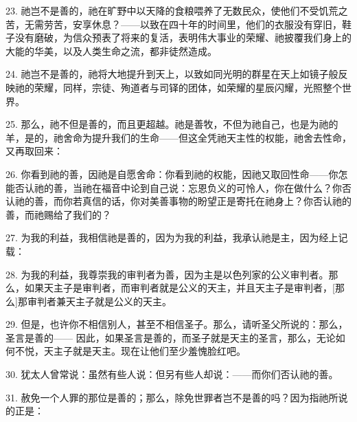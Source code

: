 23. 祂岂不是善的，祂在旷野中以天降的食粮喂养了无数民众，使他们不受饥荒之苦，无需劳苦，安享休息？——以致在四十年的时间里，他们的衣服没有穿旧，鞋子没有磨破，为信众预表了将来的复活，表明伟大事业的荣耀、祂披覆我们身上的大能的华美，以及人类生命之流，都非徒然造成。\par

24. 祂岂不是善的，祂将大地提升到天上，以致如同光明的群星在天上如镜子般反映祂的荣耀，同样，宗徒、殉道者与司铎的团体，如荣耀的星辰闪耀，光照整个世界。\par

25. 那么，祂不但是善的，而且更超越。祂是善牧，不但为祂自己，也是为祂的羊，是的，祂舍命为提升我们的生命——但这全凭祂天主性的权能，祂舍去性命，又再取回来：\par

26. 你看到祂的善，因祂是自愿舍命：你看到祂的权能，因祂又取回性命——你怎能否认祂的善，当祂在福音中论到自己说：忘恩负义的可怜人，你在做什么？你否认祂的善，而你若真信的话，你对美善事物的盼望正是寄托在祂身上？你否认祂的善，而祂赐给了我们的？\par

27. 为我的利益，我相信祂是善的，因为为我的利益，我承认祂是主，因为经上记载：\par

28. 为我的利益，我尊崇我的审判者为善，因为主是以色列家的公义审判者。那么，如果天主子是审判者，而审判者就是公义的天主，并且天主子是审判者，[那么]那审判者兼天主子就是公义的天主。\par

29. 但是，也许你不相信别人，甚至不相信圣子。那么，请听圣父所说的：那么，圣言是善的—— 因此，如果圣言是善的，而圣子就是天主的圣言，那么，无论如何不悦，天主子就是天主。现在让他们至少羞愧脸红吧。\par

30. 犹太人曾常说：虽然有些人说：但另有些人却说：——而你们否认祂的善。\par

31. 赦免一个人罪的那位是善的；那么，除免世罪者岂不是善的吗？因为指祂所说的正是：\par

